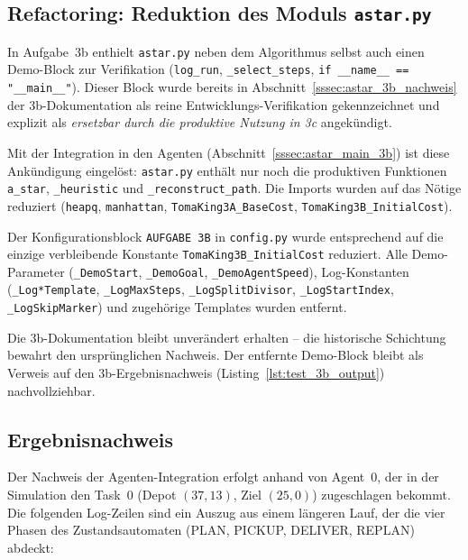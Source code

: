 \subsection{Refactoring: Reduktion des Moduls \texttt{astar.py}}
\label{sssec:refactoring_3b_demo}

In Aufgabe~3b enthielt \texttt{astar.py} neben dem Algorithmus selbst auch einen Demo-Block zur Verifikation (\texttt{log\_run}, \texttt{\_select\_steps}, \texttt{if \_\_name\_\_ == "\_\_main\_\_"}). Dieser Block wurde bereits in Abschnitt~\ref{sssec:astar_3b_nachweis} der 3b-Dokumentation als reine Entwicklungs-Verifikation gekennzeichnet und explizit als \textit{ersetzbar durch die produktive Nutzung in 3c} angekündigt.

Mit der Integration in den Agenten (Abschnitt~\ref{sssec:astar_main_3b}) ist diese Ankündigung eingelöst: \texttt{astar.py} enthält nur noch die produktiven Funktionen \texttt{a\_star}, \texttt{\_heuristic} und \texttt{\_reconstruct\_path}. Die Imports wurden auf das Nötige reduziert (\texttt{heapq}, \texttt{manhattan}, \texttt{TomaKing3A\_BaseCost}, \texttt{TomaKing3B\_InitialCost}).

Der Konfigurationsblock \texttt{AUFGABE 3B} in \texttt{config.py} wurde entsprechend auf die einzige verbleibende Konstante \texttt{TomaKing3B\_InitialCost} reduziert. Alle Demo-Parameter (\texttt{\_DemoStart}, \texttt{\_DemoGoal}, \texttt{\_DemoAgentSpeed}), Log-Konstanten (\texttt{\_Log*Template}, \texttt{\_LogMaxSteps}, \texttt{\_LogSplitDivisor}, \texttt{\_LogStartIndex}, \texttt{\_LogSkipMarker}) und zugehörige Templates wurden entfernt.

Die 3b-Dokumentation bleibt unverändert erhalten -- die historische Schichtung bewahrt den ursprünglichen Nachweis. Der entfernte Demo-Block bleibt als Verweis auf den 3b-Ergebnisnachweis (Listing~\ref{lst:test_3b_output}) nachvollziehbar.


\subsection{Ergebnisnachweis}
\label{sssec:agent_3c_nachweis}

Der Nachweis der Agenten-Integration erfolgt anhand von Agent~0, der in der Simulation den Task~0 (Depot $(37, 13)$, Ziel $(25, 0)$) zugeschlagen bekommt. Die folgenden Log-Zeilen sind ein Auszug aus einem längeren Lauf, der die vier Phasen des Zustandsautomaten (PLAN, PICKUP, DELIVER, REPLAN) abdeckt:

